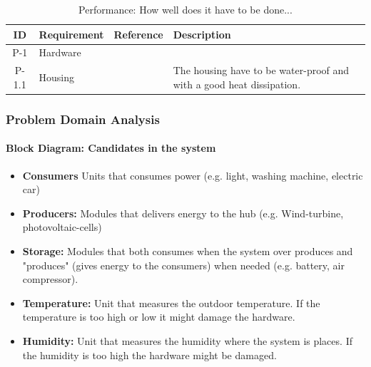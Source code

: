		\begin{table}[h!]
			\begin{tabular} [b] {| c | p{3cm} | c | p{10cm} |}
			\hline
			\textbf{ID} & \textbf{Requirement} & \textbf{Reference} & \textbf{Description} \\ \hline
			P-1 & Hardware &  &  \\ \hline
			P-1.1 & Housing &  & The housing have to be water-proof and with a good heat dissipation. \\ \hline
		\end{tabular}
		\caption{Performance: How well does it have to be done...}
		\end{table}
		\newpage
	\subsubsection{Problem Domain Analysis}
			\paragraph{Block Diagram: Candidates in the system}
			\begin{itemize}
				\item \textbf{Consumers} Units that consumes power (e.g. light, washing machine, electric car)
				\item \textbf{Producers:} Modules that delivers energy to the hub (e.g. Wind-turbine, photovoltaic-cells)
				\item \textbf{Storage:} Modules that both consumes when the system over produces and "produces" (gives energy to the consumers) when needed (e.g. battery, air compressor). 
				\item \textbf{Temperature:} Unit that measures the outdoor temperature. If the temperature is too high or low it might damage the hardware.
				\item \textbf{Humidity:} Unit that measures the humidity where the system is places. If the humidity is too high the hardware might be damaged.
			\end{itemize}
